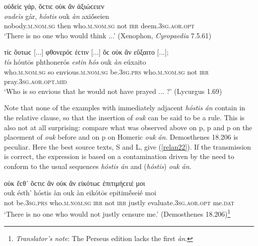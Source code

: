 \begin{exe}
\ex οὐδεὶϲ γάρ, ὅϲτιϲ οὐκ ἂν ἀξιώϲειεν\\
\gll \emph{oudeìs} gár, \emph{hóstis} ouk \emph{àn} axiṓseien\\
nobody.\textsc{m.nom.sg} then who.\textsc{m.nom.sg} not \textsc{irr} deem.\textsc{3sg.aor.opt}\\
\trans `There is no one who would think ...' (Xenophon, \textit{Cyropaedia} 7.5.61)
\label{relan20}
\end{exe}

\begin{exe}
\ex τίϲ ὅυτωϲ {[}...{]} φθονερόϲ ἐϲτιν {[}...{]} ὅϲ οὐκ ἂν εὔξαιτο {[}...{]};\\ 
\gll \emph{tís} hóutōs phthonerós \emph{estin} \emph{hós} ouk \emph{àn} eúxaito\\
who.\textsc{m.nom.sg} so envious.\textsc{m.nom.sg} be.\textsc{3sg.prs} who.\textsc{m.nom.sg} not \textsc{irr} pray.\textsc{3sg.aor.opt.mid}\\
\trans `Who is so envious that he would not have prayed ... ?' (Lycurgus 1.69)
\label{relan21}
\end{exe}

Note that none of the examples with immediately adjacent \emph{hóstis án} contain  in the relative clause, so that the insertion of \emph{ouk} can be said to be a rule. This is also not at all surprising: compare what was observed above on p\pageref{ouk1}, p\pageref{ouk2} and p\pageref{ouk3} on the placement of \emph{ouk} before  and on p\pageref{ouk4} on Homeric \emph{ouk án}. Demosthenes 18.206 is peculiar. Here the best source texts, S and L, give (\ref{relan22}). If the transmission is correct, the expression is based on a contamination driven by the need to conform to the usual sequences \emph{hóstis án} and (\emph{hóstis}) \emph{ouk án}.

\begin{exe}
\ex οὐκ ἔϲθ᾽ ὅϲτιϲ ἂν οὐκ ἂν εἰκότωϲ ἐπιτιμήϲειέ μοι\\
\gll ouk ésth' hóstis àn ouk àn eikótōs epitimḗseié moi\\
not be.\textsc{3sg.prs} who.\textsc{m.nom.sg} \textsc{irr} not \textsc{irr}
justly evaluate.\textsc{3sg.aor.opt} me.\textsc{dat}\\
\trans `There is no one who would not justly censure me.' (Demosthenes 18.206)\footnote{\emph{Translator's note}: The Perseus edition lacks the first \textit{àn}.}
\label{relan22}
\end{exe}

